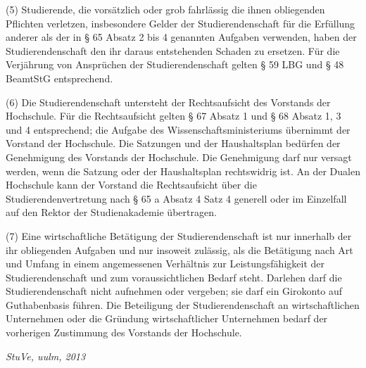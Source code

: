 \documentclass[
10pt,
a4paper,
twoside,								%
titlepage=false,							%
draft=false								%
]{scrartcl}
\begin{document}
(5) Studierende, die vorsätzlich oder grob fahrlässig die ihnen obliegenden Pflichten verletzen, insbesondere Gelder der Studierendenschaft für die Erfüllung anderer als der in § 65 Absatz 2 bis 4 genannten Aufgaben verwenden, haben der Studierendenschaft den ihr daraus entstehenden Schaden zu ersetzen. Für die Verjährung von Ansprüchen der Studierendenschaft gelten § 59 LBG und § 48 BeamtStG entsprechend.

(6) Die Studierendenschaft untersteht der Rechtsaufsicht des Vorstands der Hochschule. Für die Rechtsaufsicht gelten § 67 Absatz 1 und § 68 Absatz 1, 3 und 4 entsprechend; die Aufgabe des Wissenschaftsministeriums übernimmt der Vorstand der Hochschule. Die Satzungen und der Haushaltsplan bedürfen der Genehmigung des Vorstands der Hochschule. Die Genehmigung darf nur versagt werden, wenn die Satzung oder der Haushaltsplan rechtswidrig ist. An der Dualen Hochschule kann der Vorstand die Rechtsaufsicht über die Studierendenvertretung nach § 65 a Absatz 4 Satz 4 generell oder im Einzelfall auf den Rektor der Studienakademie übertragen.

(7) Eine wirtschaftliche Betätigung der Studierendenschaft ist nur innerhalb der ihr obliegenden Aufgaben und nur insoweit zulässig, als die Betätigung nach Art und Umfang in einem angemessenen Verhältnis zur Leistungsfähigkeit der Studierendenschaft und zum voraussichtlichen Bedarf steht. Darlehen darf die Studierendenschaft nicht aufnehmen oder vergeben; sie darf ein Girokonto auf Guthabenbasis führen. Die Beteiligung der Studierendenschaft an wirtschaftlichen Unternehmen oder die Gründung wirtschaftlicher Unternehmen bedarf der vorherigen Zustimmung des Vorstands der Hochschule.


\newpage
\thispagestyle{empty}
\null
\vfill
\begin{center}
	\textit{StuVe, uulm, 2013}
\end{center}
\end{document}
